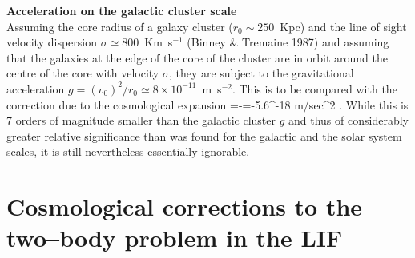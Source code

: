   {\bf Acceleration on the galactic cluster scale}\\
  Assuming the core radius of a galaxy cluster ($r_0\sim
  250$~Kpc) and the line of sight velocity dispersion $\sigma \simeq
  800$~Km~s$^{-1}$ (Binney \& Tremaine 1987) and assuming that the
  galaxies at the edge of the core of the cluster are in orbit around the 
  centre of
  the core with velocity $\sigma$, they are subject to the gravitational 
  acceleration $g=(v_0)^2/r_0\simeq 8 \times 10^{-11}$~m~s$^{-2}$. This is
  to be compared with the correction due to the cosmological expansion \be
{}=-=-5.6^{-18} {\mbox
m}/\mbox{sec}^2 \; .  \ee 
While this is 7 orders of magnitude smaller than the
galactic cluster $g$ and thus of considerably greater relative
significance than was found for the galactic and the solar system scales,
it is still nevertheless essentially ignorable.
  
  
\section{Cosmological corrections to the two--body problem in the LIF}
  
